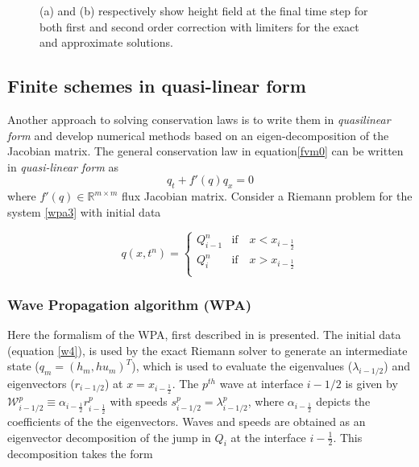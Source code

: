 \documentclass[10pt,a4paper]{article}
\begin{document}
\begin{figure}[H]
\begin{subfigure}[b]{0.5\textwidth}
			\caption{}
			\label{fig:exapp}
		\end{subfigure}
		\caption{(a) and (b) respectively show height field at the final time step for both first and second order correction with limiters for the exact and approximate solutions.}
	\end{figure}


	\subsection{Finite schemes in quasi-linear form}
	Another approach to solving conservation laws is to write  them in  {\em quasilinear form} and develop numerical methods based on an eigen-decomposition of the Jacobian matrix. The general conservation law in equation\eqref{fvm0} can be written in {\em quasi-linear form}
as
\begin{equation}
	q_{t} + f'(q)q_{x} = 0
	\label{wpa3}
\end{equation}
where  $f'(q) \in \mathbb{R}^{m\times m}$  flux Jacobian matrix.  Consider a Riemann problem for the system  \eqref{wpa3} with initial data 

\begin{equation}
	q(x,t^n)  = \begin{cases}
		Q_{i-1}^{n}  & \text{if} \quad  x < x_{i-\frac{1}{2}}\\
		Q_{i}^{n} & \text{if} \quad x > x_{i-\frac{1}{2}}\\
	\end{cases}    
	\label{w4}   
\end{equation}
\subsubsection{Wave Propagation algorithm (WPA)}
 Here the formalism of the WPA, first described in \cite{le:1997} is presented.   The initial data (equation \eqref{w4}), is used by the exact Riemann solver to generate an intermediate state ($q_m = (h_m, hu_m)^T$), which is used to evaluate the eigenvalues ($\lambda_{i-1/2}$) and eigenvectors ($r_{i-1/2}$) at $x = x_{i-\frac{1}{2}}$. The $p^{th}$ wave at interface $i-1/2$ is given by $\mathcal W^p_{i-1/2} \equiv \alpha_{i-\frac{1}{2}} r^p_{i-\frac{1}{2}}$ with speeds $s^p_{i-1/2} = \lambda^p_{i-1/2}$, where $ \alpha_{i-\frac{1}{2}}$ depicts the coefficients of the the eigenvectors.  Waves and speeds are obtained as an eigenvector decomposition of the jump in $Q_i$ at the interface $i-\frac{1}{2}$.  This decomposition takes the form
\end{document}
